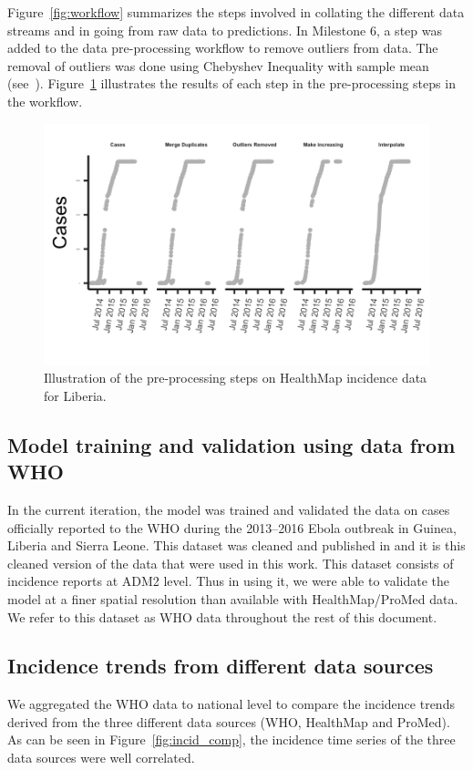 \documentclass[11pt,]{article}
\begin{document}
Figure~\ref{fig:workflow} summarizes the steps involved in collating
the different data streams and in going from raw data to predictions. In Milestone 6, a step was added to the data pre-processing workflow
to remove outliers from data. The removal of outliers was done using Chebyshev Inequality
with sample mean (see~\cite{saw1984chebyshev}). Figure~\ref{fig:wf_example} illustrates
the results of each step in the pre-processing steps in the workflow.

\begin{figure}
  \centering
  \includegraphics[]{ms6-figures/liberia-preprocessing2}
  \caption{Illustration of the pre-processing steps on HealthMap incidence
    data for Liberia.}
  \label{fig:wf_example}
\end{figure}
\FloatBarrier

\subsection{Model training and validation using data from
WHO}\label{model-training-and-validation-using-data-from-who}

In the current iteration, the model was trained and validated the data
on cases officially reported to the WHO during the 2013--2016 Ebola
outbreak in Guinea, Liberia and Sierra Leone. This dataset was cleaned
and published in \citep{garske20160308} and it is this cleaned version
of the data that were used in this work. This dataset consists of
incidence reports at ADM2 level. Thus in using it, we were able to validate the model at a finer spatial resolution than available
with HealthMap/ProMed data. We refer to this dataset as WHO data
throughout the rest of this document.

\subsection{Incidence trends from different data sources}
We aggregated the WHO data to national level to compare the incidence
trends derived from the three different data sources (WHO, HealthMap
and ProMed). As can be seen in Figure~\ref{fig:incid_comp}, the incidence time series
of the three data sources were well correlated.
\end{document}
